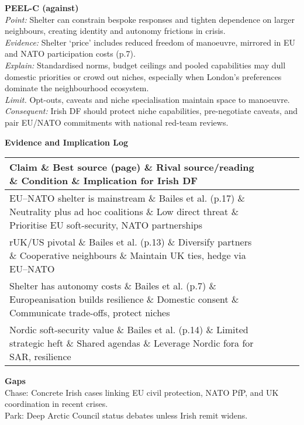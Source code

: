 \textbf{PEEL-C (against)}\\
\textit{Point:} Shelter can constrain bespoke responses and tighten dependence on larger neighbours, creating identity and autonomy frictions in crisis.\\
\textit{Evidence:} Shelter ‘price’ includes reduced freedom of manoeuvre, mirrored in EU and NATO participation costs (p.7).\\
\textit{Explain:} Standardised norms, budget ceilings and pooled capabilities may dull domestic priorities or crowd out niches, especially when London’s preferences dominate the neighbourhood ecosystem.\\
\textit{Limit.} Opt-outs, caveats and niche specialisation maintain space to manoeuvre.\\
\textit{Consequent:} Irish DF should protect niche capabilities, pre-negotiate caveats, and pair EU/NATO commitments with national red-team reviews.

\textbf{Evidence and Implication Log}
\begin{tabular}{p{3.2cm}p{4.2cm}p{3.6cm}p{3.2cm}p{4.2cm}}
	\textbf{Claim} \& \textbf{Best source (page)} \& \textbf{Rival source/reading} \& \textbf{Condition} \& \textbf{Implication for Irish DF}\\\hline
	EU–NATO shelter is mainstream \& Bailes et al. (p.17) \& Neutrality plus ad hoc coalitions \& Low direct threat \& Prioritise EU soft-security, NATO partnerships\\
	rUK/US pivotal \& Bailes et al. (p.13) \& Diversify partners \& Cooperative neighbours \& Maintain UK ties, hedge via EU–NATO\\
	Shelter has autonomy costs \& Bailes et al. (p.7) \& Europeanisation builds resilience \& Domestic consent \& Communicate trade-offs, protect niches\\
	Nordic soft-security value \& Bailes et al. (p.14) \& Limited strategic heft \& Shared agendas \& Leverage Nordic fora for SAR, resilience\\
\end{tabular}

\textbf{Gaps}\\
Chase: Concrete Irish cases linking EU civil protection, NATO PfP, and UK coordination in recent crises.\\
Park: Deep Arctic Council status debates unless Irish remit widens.

\parencite{BESSNER_2015}


